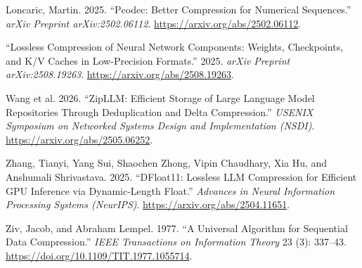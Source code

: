\documentclass[
]{article}
\newlength{\cslhangindent}
\newenvironment{CSLReferences}[2] %
 {\begin{list}{}{%
  \setlength{\itemindent}{0pt}
  \setlength{\leftmargin}{0pt}
  \setlength{\parsep}{0pt}
  \ifodd #1
   \setlength{\leftmargin}{\cslhangindent}
   \setlength{\itemindent}{-1\cslhangindent}
  \fi
  \setlength{\itemsep}{#2\baselineskip}}}
 {\end{list}}
\begin{document}
\begin{CSLReferences}{1}{0}
Loncaric, Martin. 2025. {``Pcodec: Better Compression for Numerical
Sequences.''} \emph{arXiv Preprint arXiv:2502.06112}.
\url{https://arxiv.org/abs/2502.06112}.

{``Lossless Compression of Neural Network Components: Weights,
Checkpoints, and {K/V} Caches in Low-Precision Formats.''} 2025.
\emph{arXiv Preprint arXiv:2508.19263}.
\url{https://arxiv.org/abs/2508.19263}.

Wang et al. 2026. {``{ZipLLM}: Efficient Storage of Large Language Model
Repositories Through Deduplication and Delta Compression.''}
\emph{USENIX Symposium on Networked Systems Design and Implementation
(NSDI)}. \url{https://arxiv.org/abs/2505.06252}.

Zhang, Tianyi, Yang Sui, Shaochen Zhong, Vipin Chaudhary, Xia Hu, and
Anshumali Shrivastava. 2025. {``{DFloat11}: Lossless {LLM} Compression
for Efficient {GPU} Inference via Dynamic-Length Float.''}
\emph{Advances in Neural Information Processing Systems (NeurIPS)}.
\url{https://arxiv.org/abs/2504.11651}.

Ziv, Jacob, and Abraham Lempel. 1977. {``A Universal Algorithm for
Sequential Data Compression.''} \emph{IEEE Transactions on Information
Theory} 23 (3): 337--43. \url{https://doi.org/10.1109/TIT.1977.1055714}.

\end{CSLReferences}
\end{document}
